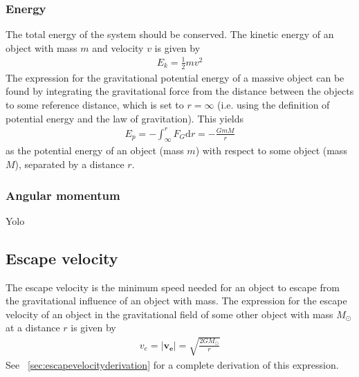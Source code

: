 \documentclass[aps,reprint]{revtex4-1}
\begin{document}
\subsubsection{Energy}
The total energy of the system should be conserved. The kinetic energy of an object with
mass $m$ and velocity $v$ is given by
\begin{align*}
 E_k = \frac{1}{2}m v^2
\end{align*}
The expression for the gravitational potential energy of a massive object can be found by
integrating the gravitational force from the distance between the objects to some reference
distance, which is set to $r = \infty$ (i.e. using the definition of potential energy and the law
of gravitation). This yields
\begin{align*}
  \label{eq:potentialenergy}
 E_p = -\int_\infty^r F_G \text{d} r = -\frac{GmM}{r}
\end{align*}
as the potential energy of an object (mass $m$) with respect to some object (mass $M$),
separated by a distance $r$.
\subsubsection{Angular momentum}
Yolo
\subsection{Escape velocity}
The escape velocity is the minimum speed needed for an object to escape from the
gravitational influence of an object with mass. The expression for the escape
velocity of an object in the gravitational field of some other object with mass
$M_\odot$ at a distance $r$ is given by
\begin{align}
  v_e = |\mathbf{v_e}| = \sqrt{\frac{2GM_\odot}{r}}
\end{align}
See ~\ref{sec:escapevelocityderivation} for a complete derivation of this expression.
\end{document}
